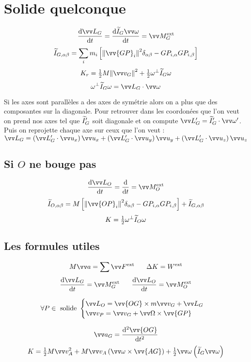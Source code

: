\documentclass[../main.tex]{subfiles}
\begin{document}
\section{Solide quelconque}
\[
  \dv{\mc_G}{t}=\dv{\widetilde{I}_G\vian}{t}=\mf_G^{\exte}
\]
\[
  \ti_{G,\alpha\beta}=\sum_im_i\left[\norm{\vv{GP}_i}^2\delta_{\alpha\beta} - GP_{i,\alpha}GP_{i,\beta}\right]
\]
\[
  K_r = \tfrac{1}{2}M\norm{\vi_G}^2 + \tfrac{1}{2}\omega^{\bot}\ti_G\omega
\]
\[
  \omega^{\bot}\ti_G\omega=\mc_G\cdot\vian
\]

Si les axes sont parallèles a des axes de symétrie alors on a plus que des composantes sur la diagonale. Pour retrouver dans les coordonées que l'on veut on prend nos axes tel que \(\widetilde{I}_G'\) soit diagonale et on compute \(\mc_G'=\ti_G'\cdot\vian'\). Puis on reprojette chaque axe sur ceux que l'on veut : \(\mc_G=\left(\mc_G'\cdot\ux\right)\ux + \left(\mc_G'\cdot\uy\right)\uy + \left(\mc_G'\cdot\uz\right)\uz\)

\subsection{Si \(O\) ne bouge pas}
\[
  \dv{\mc_O}{t}=\dv{}{t}(\widetilde{I}_O\vian)=\mf_O^{\exte}
\]
\[
  \ti_{O,\alpha\beta}=M\left[\norm{\vv{OP}_i}^2\delta_{\alpha\beta} - GP_{i,\alpha}GP_{i,\beta}\right] + \ti_{G,\alpha\beta}
\]
\[
  K =\tfrac{1}{2}\omega^{\bot}\widetilde{I}_O\omega
\]
\subsection{Les formules utiles}
\[
  M\ac = \sum\F^{\exte} \phantom{text} \Delta K = W^{\exte}
\]
\[
  \dv{\mc_G}{t}=\mf_G^{\exte} \phantom{text} \dv{\mc_O}{t}=\mf_O^{\exte}
\]

\[ \forall P\in \text{ solide } 
  \begin{cases}
    \mc_O = \vv{OG}\times m\vi_G + \mc_G \\
    \vi_P = \vi_G + \Vian\times\vv{GP}
  \end{cases}
\]

\[
  \ac_G = \dv[2]{\vv{OG}}{t}
\]
\[
  K = \tfrac{1}{2}M\vi_A^2 + M\vi_A\left(\vian\times\vv{AG}\right) + \tfrac{1}{2}\vian\left(\ti_G\vian\right)
\]
\end{document}
